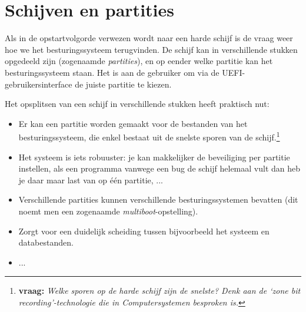 

\section{Schijven en partities}





Als in de opstartvolgorde verwezen wordt naar een harde schijf
is de vraag weer hoe we het besturingssysteem terugvinden. De schijf kan in verschillende stukken
opgedeeld zijn (zogenaamde \emph{partities}), en op eender welke partitie kan het besturingssysteem staan.
Het is aan de gebruiker om via de UEFI-gebruikersinterface de juiste partitie te kiezen.

Het opsplitsen van een schijf in verschillende stukken heeft praktisch nut:
\begin{itemize}
\item Er kan een partitie worden gemaakt voor de bestanden van het besturingssysteem, die enkel bestaat uit de snelste sporen van de schijf.\footnote{\textbf{vraag:} \emph{Welke sporen op de harde schijf zijn de snelste? Denk aan de `zone bit recording'-technologie die in Computersystemen besproken is.}}
\item Het systeem is iets robuuster: je kan makkelijker de beveiliging per partitie instellen, als een programma vanwege een bug de schijf helemaal vult dan heb je daar maar last van op \'e\'en partitie, ...
\item Verschillende partities kunnen verschillende besturingssystemen bevatten (dit noemt men een zogenaamde \emph{multiboot}-opstelling).
\item Zorgt voor een duidelijk scheiding tussen bijvoorbeeld het systeem en databestanden.
\item ...
\end{itemize}

